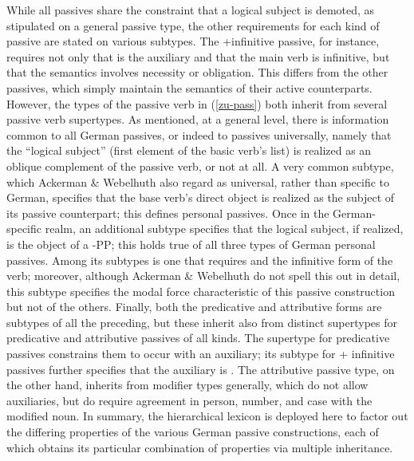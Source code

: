 \documentclass[output=paper]{langsci/langscibook}
\begin{document}
While all passives share the constraint that a logical subject is demoted, as stipulated on a general  passive type, the other requirements for each kind of passive are stated on various subtypes.
The +infinitive passive, for instance, requires not only that  is the auxiliary and that the main verb is infinitive, but that the semantics involves necessity or obligation.
This differs from the other passives, which simply maintain the semantics of their active counterparts.
However, the types of the passive verb  in (\ref{zu-pass}) both inherit from several passive verb supertypes.
As mentioned, at a general level, there is information common to all German passives, or indeed to passives universally, namely that the ``logical subject'' (first element of the basic verb's  list) is realized as an oblique complement of the passive verb, or not at all.
A very common subtype, which Ackerman \& Webelhuth also regard as universal, rather than specific to German, specifies that the base verb's direct object is realized as the subject of its passive counterpart; this defines personal passives.
Once in the German-specific realm, an additional subtype specifies that the logical subject, if realized, is the object of a -PP; this holds true of all three types of German personal passives.
Among its subtypes is one that requires  and the infinitive form of the verb; moreover, although Ackerman \& Webelhuth do not spell this out in detail, this subtype specifies the modal force characteristic of this passive construction but not of the others.
Finally, both the predicative and attributive forms are subtypes of all the preceding, but these inherit also from distinct supertypes for predicative and attributive passives of all kinds.
The supertype for predicative passives constrains them to occur with an auxiliary; its subtype for  + infinitive passives further specifies that the auxiliary is .
The attributive passive type, on the other hand, inherits from modifier types generally, which do not allow auxiliaries, but do require agreement in person, number, and case with the modified noun.
In summary, the hierarchical lexicon is deployed here to factor out the differing properties of the various German passive constructions, each of which obtains its particular combination of properties via multiple inheritance.
\end{document}
